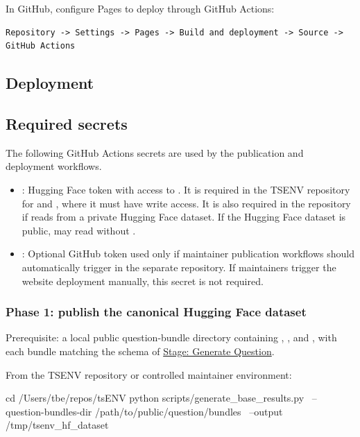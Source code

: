 \documentclass[11pt]{article}
\begin{document}
In GitHub, configure Pages to deploy through GitHub Actions:

\begin{verbatim}
Repository -> Settings -> Pages -> Build and deployment -> Source -> GitHub Actions
\end{verbatim}




\subsection*{Deployment}
\label{sec:website-deployment}


\subsection*{Required secrets}
  The following GitHub Actions secrets are used by the publication and deployment workflows.
  \begin{itemize}
    \item {}: Hugging Face token with access to .
    It is required in the TSENV repository for  and , where it must have write access.
    It is also required in the  repository if  reads from a private Hugging Face dataset.
    If the Hugging Face dataset is public,  may read without .
    \item {}: Optional GitHub token used only if maintainer publication workflows should automatically trigger  in the separate  repository.
    If maintainers trigger the website deployment manually, this secret is not required.
  \end{itemize}

\subsubsection*{Phase 1: publish the canonical Hugging Face dataset}
Prerequisite: a local public question-bundle directory containing , , and , with each bundle matching the schema of \hyperref[docstart:generate_question_stage]{Stage: Generate Question}.

From the TSENV repository or controlled maintainer environment:
\begin{DocCode}
cd /Users/tbe/repos/tsENV
python scripts/generate_base_results.py \
    --question-bundles-dir /path/to/public/question/bundles \
    --output /tmp/tsenv_hf_dataset
\end{DocCode}
\end{document}
